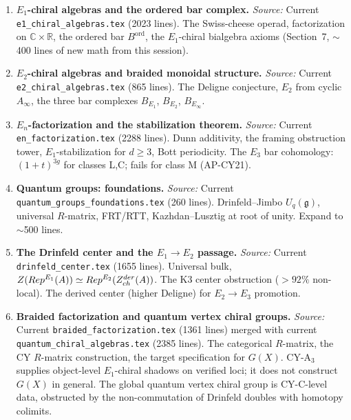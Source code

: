 \documentclass[11pt]{article}
\newcommand{\Eone}{E_1}
\newcommand{\En}{E_n}
\newcommand{\Rep}{\mathrm{Rep}}
\newcommand{\Ainf}{A_\infty}
\newcommand{\C}{\mathbb{C}}
\begin{document}
\begin{enumerate}[label=\textbf{Ch.\,\arabic*.},leftmargin=3.5em,start=8]
\item \textbf{$E_1$-chiral algebras and the ordered bar complex.}
 \textit{Source:} Current \texttt{e1\_chiral\_algebras.tex} (2023 lines).
 The Swiss-cheese operad, factorization on $\C\times\mathbb{R}$,
 the ordered bar $B^{\mathrm{ord}}$, the $E_1$-chiral bialgebra
 axioms (Section~7, $\sim$400 lines of new math from this session).

\item \textbf{$E_2$-chiral algebras and braided monoidal structure.}
 \textit{Source:} Current \texttt{e2\_chiral\_algebras.tex} (865 lines).
 The Deligne conjecture, $E_2$ from cyclic $\Ainf$, the three bar
 complexes $B_{E_1}$, $B_{E_2}$, $B_{E_\infty}$.

\item \textbf{$\En$-factorization and the stabilization theorem.}
 \textit{Source:} Current \texttt{en\_factorization.tex} (2288 lines).
 Dunn additivity, the framing obstruction tower, $E_1$-stabilization
 for $d\geq 3$, Bott periodicity. The $E_3$ bar cohomology:
 $(1+t)^{3g}$ for classes L,C; fails for class M (AP-CY21).

\item \textbf{Quantum groups: foundations.}
 \textit{Source:} Current \texttt{quantum\_groups\_foundations.tex}
 (260 lines). Drinfeld--Jimbo $U_q(\mathfrak{g})$, universal
 $R$-matrix, FRT/RTT, Kazhdan--Lusztig at root of unity.
 Expand to $\sim$500 lines.

\item \textbf{The Drinfeld center and the $E_1\to E_2$ passage.}
 \textit{Source:} Current \texttt{drinfeld\_center.tex} (1655 lines).
 Universal bulk, $\cZ(\Rep^{E_1}(A))\simeq\Rep^{E_2}(Z^{\mathrm{der}}_{\mathrm{ch}}(A))$.
 The K3 center obstruction ($>92\%$ non-local). The derived center
 (higher Deligne) for $E_2\to E_3$ promotion.

\item \textbf{Braided factorization and quantum vertex chiral groups.}
 \textit{Source:} Current \texttt{braided\_factorization.tex}
 (1361 lines) merged with current \texttt{quantum\_chiral\_algebras.tex}
 (2385 lines). The categorical $R$-matrix, the CY $R$-matrix
 construction, the target specification for $G(X)$. CY-A$_3$ supplies
 object-level $\Eone$-chiral shadows on verified loci; it does not
 construct $G(X)$ in general. The global quantum vertex chiral group is
 CY-C-level data, obstructed by the non-commutation of Drinfeld doubles
 with homotopy colimits.
\end{enumerate}
\end{document}
